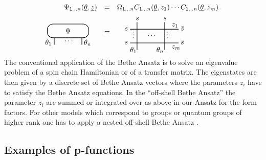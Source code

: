 \documentclass[a4paper,12pt]{article}
\begin{document}
\[
\begin{array}{rcl}
\Psi _{1\dots n}({\underline{\theta }},\underline{z}) & = & \Omega _{1\dots
n}C_{1\dots n}({\underline{\theta }},z_{1})\cdots C_{1\dots n}({\underline{%
\theta }},z_{m})\,. \\ 
\begin{array}{c}
\unitlength3.4mm\begin{picture}(6,4) \thicklines\put(3,2){\oval(6,2)}
\put(3,2){\makebox(0,0){$\Psi$}} \put(1,0){\line(0,1){1}}
\put(5,0){\line(0,1){1}} \put(-.3,0){$\theta_1$} \put(5.3,0){$\theta_n$}
\put(2.5,.5){$\dots$} \end{picture}
\end{array}
~~ & = & ~~~~ 
\begin{array}{c}
\unitlength3.4mm\begin{picture}(7,5.5) \thicklines \put(0,1){\line(1,0){7}}
\put(0,3){\line(1,0){7}} \put(1,0){\line(0,1){4}} \put(5,0){\line(0,1){4}}
\put(.8,4.3){$s$} \put(4.8,4.3){$s$} \put(-.8,2.8){$s$} \put(-.8,.8){$s$}
\put(7.3,2.8){$\bar s$} \put(7.3,.8){$\bar s$} \put(0,-.3){$\theta_1$}
\put(3.8,-.3){$\theta_n$} \put(6,.2){$z_m$} \put(6,3.4){$z_1$}
\put(2.5,2){$\dots$} \put(.3,1.7){$\vdots$} \put(5.3,1.7){$\vdots$}
\end{picture}
\end{array}
\,
\end{array}
\]
The conventional \cite{BA} application of the Bethe Ansatz is to solve an
eigenvalue problem of a spin chain Hamiltonian or of a transfer matrix. The
eigenstates are then given by a discrete set of Bethe Ansatz vectors where
the parameters $z_{i}$ have to satisfy the Bethe Ansatz equations. In the
``off-shell Bethe Ansatz'' \cite{OSBA} the parameter $z_{i}$ are summed or
integrated over as above in our Ansatz for the form factors. For other
models which correspond to groups or quantum groups of higher rank one has
to apply a nested off-shell Bethe Ansatz \cite{BKZ}.

\subsection*{Examples of p-functions}
\end{document}
